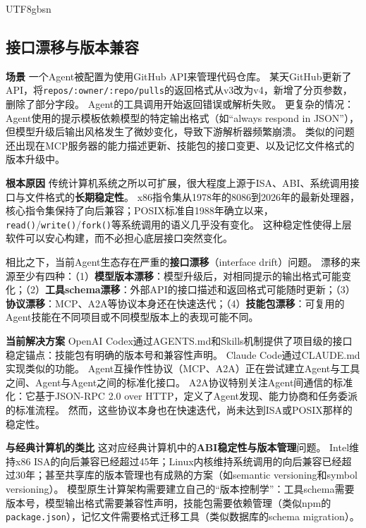 \documentclass[11pt,a4paper]{article}
\begin{document}
\begin{CJK*}{UTF8}{gbsn}
\subsection{接口漂移与版本兼容}

\textbf{场景}
一个Agent被配置为使用GitHub API来管理代码仓库。
某天GitHub更新了API，将\texttt{repos/:owner/:repo/pulls}的返回格式从v3改为v4，新增了分页参数，删除了部分字段。
Agent的工具调用开始返回错误或解析失败。
更复杂的情况：Agent使用的提示模板依赖模型的特定输出格式（如``always respond in JSON''），但模型升级后输出风格发生了微妙变化，导致下游解析器频繁崩溃。
类似的问题还出现在MCP服务器的能力描述更新、技能包的接口变更、以及记忆文件格式的版本升级中。

\textbf{根本原因}
传统计算机系统之所以可扩展，很大程度上源于ISA、ABI、系统调用接口与文件格式的\textbf{长期稳定性}。
x86指令集从1978年的8086到2026年的最新处理器，核心指令集保持了向后兼容；POSIX标准自1988年确立以来，\texttt{read()}/\texttt{write()}/\texttt{fork()}等系统调用的语义几乎没有变化\cite{ostep_2023}。
这种稳定性使得上层软件可以安心构建，而不必担心底层接口突然变化。

相比之下，当前Agent生态存在严重的\textbf{接口漂移}（interface drift）问题。
漂移的来源至少有四种：（1）\textbf{模型版本漂移}：模型升级后，对相同提示的输出格式可能变化；（2）\textbf{工具schema漂移}：外部API的接口描述和返回格式可能随时更新\cite{mcp_intro_2026}；（3）\textbf{协议漂移}：MCP、A2A等协议本身还在快速迭代\cite{agentprotocols2025,google_a2a_2025}；（4）\textbf{技能包漂移}：可复用的Agent技能在不同项目或不同模型版本上的表现可能不同。

\textbf{当前解决方案}
OpenAI Codex通过AGENTS.md\cite{openai_codex_agents_md_2026}和Skills\cite{openai_codex_skills_2026}机制提供了项目级的接口稳定锚点：技能包有明确的版本号和兼容性声明。
Claude Code通过CLAUDE.md\cite{anthropic_claudecode_memory_2026}实现类似的功能。
Agent互操作性协议（MCP\cite{mcp_intro_2026}、A2A\cite{google_a2a_2025}）正在尝试建立Agent与工具之间、Agent与Agent之间的标准化接口。
A2A协议特别关注Agent间通信的标准化：它基于JSON-RPC 2.0 over HTTP，定义了Agent发现、能力协商和任务委派的标准流程\cite{google_a2a_2025}。
然而，这些协议本身也在快速迭代，尚未达到ISA或POSIX那样的稳定性。

\textbf{与经典计算机的类比}
这对应经典计算机中的\textbf{ABI稳定性与版本管理}问题。
Intel维持x86 ISA的向后兼容已经超过45年；Linux内核维持系统调用的向后兼容已经超过30年；甚至共享库的版本管理也有成熟的方案（如semantic versioning和symbol versioning）。
模型原生计算架构需要建立自己的``版本控制学''：工具schema需要版本号，模型输出格式需要兼容性声明，技能包需要依赖管理（类似npm的\texttt{package.json}），记忆文件需要格式迁移工具（类似数据库的schema migration）。


\end{CJK*}
\end{document}
